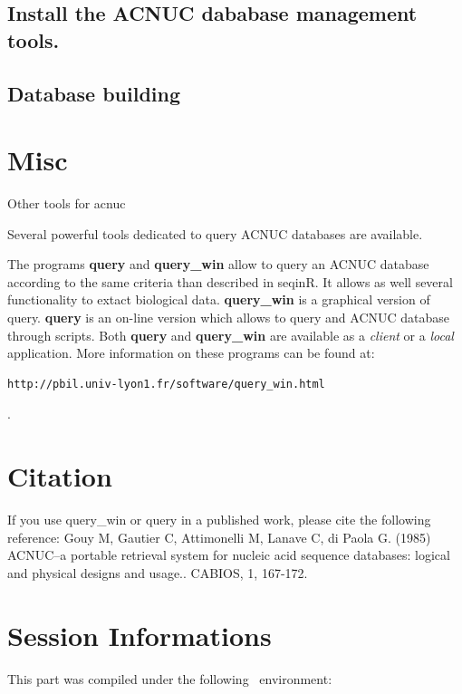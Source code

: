 \documentclass{article}
\begin{document}
\subsection{Install the ACNUC dababase management tools.}

\subsection{Database building}

\section{Misc} 

Other tools for acnuc

Several powerful tools dedicated to query ACNUC databases are available. 

The programs \textbf{query} and \textbf{query\_win} allow to query an ACNUC database according to the same
criteria than described  in seqinR. It allows as well several functionality to extact biological data.
\textbf{query\_win} is a graphical version of query.
\textbf{query} is an on-line version which allows to query and ACNUC database through scripts.
Both \textbf{query} and  \textbf{query\_win} are available as a
\textit{client} or a \textit{local} application. More information on these programs can be found at:
\begin{verbatim}
http://pbil.univ-lyon1.fr/software/query_win.html
\end{verbatim}. 




\section{Citation} 

If you use query\_win or query in a published work, please cite the following reference:
Gouy M, Gautier C, Attimonelli M, Lanave C, di Paola G. (1985)
 ACNUC--a portable retrieval system for nucleic acid sequence databases: 
 logical and physical designs and usage.. CABIOS, 1, 167-172. 



\section{Session Informations}

This part was compiled under the following \Rlogo{}~environment:
\end{document}
